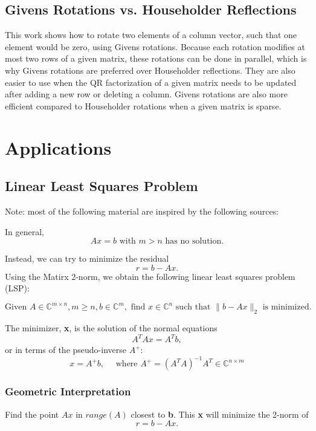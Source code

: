 \documentclass{article}
\begin{document}
\subsection{Givens Rotations vs. Householder Reflections}

This work shows how to rotate two elements of a column vector, such that one element would be zero, using Givens rotations. Because each rotation modifies at most two rows of a given matrix, these rotations can be done in parallel, which is why Givens rotations are preferred over Householder reflections. They are also easier to use when the QR factorization of a given matrix needs to be updated after adding a new row or deleting a column. Givens rotations are also more efficient compared to Householder rotations when a given matrix is sparse.


\section{Applications}
\subsection{Linear Least Squares Problem}
Note: most of the following material are inspired by the following sources: \cite{strang_linear_1980}\cite{gene_h__golub__gene_howard_matrix_2013}

In general,
$$Ax = b \text{ with } m > n \text{ has no solution.}$$

Instead, we can try to minimize the residual $$r=b-Ax.$$
Using the Matirx 2-norm, we obtain the following linear least squares problem (LSP):

$$
\text{Given } A \in \mathbb{C}^{m {\times} n}, m \ge n, b \in \mathbb{C}^{m},
\text{ find } x \in \mathbb{C}^{n} \text{ such that } \| b- Ax\|_{2} \text{ is minimized.}
$$

The minimizer, \textbf{x}, is the solution of the normal equations
$$
A^{T}Ax = A^{T}b,
$$ or in terms of the pseudo-inverse $A^{+}$:
$$
x = A^{+}b, \quad \text{ where } A^{+} = (A^{T}A)^{-1}A^{T} \in \mathbb{C}^{n {\times} m} 
$$

\subsubsection{Geometric Interpretation}

Find the point $Ax$ in $range(A)$ closest to \textbf{b}. This \textbf{x} will minimize the 2-norm of 
$$
r=b-Ax.
$$
\end{document}
